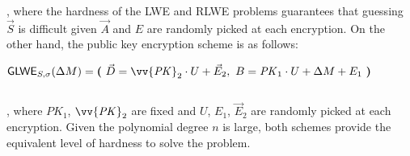 $ $

, where the hardness of the LWE and RLWE problems guarantees that guessing $\vec{S}$ is difficult given $\vec{A}$ and $E$ are randomly picked at each encryption. On the other hand, the public key encryption scheme is as follows: 

$\textsf{GLWE}_{S, \sigma}(\Delta M) = \bm{(} \text{ } \vec{D} = \vv{{\mathit{PK}}}_2 \cdot U + \vec{E}_2, \text{ } B = \mathit{PK}_1\cdot U + \Delta  M + E_1 \text{ } \bm{)}$

$ $

, where $\mathit{PK}_1$, $\vv{\mathit{PK}}_2$ are fixed and $U$, $E_1$, $\vec{E}_2$ are randomly picked at each encryption. Given the polynomial degree $n$ is large, both schemes provide the equivalent level of hardness to solve the problem. 

